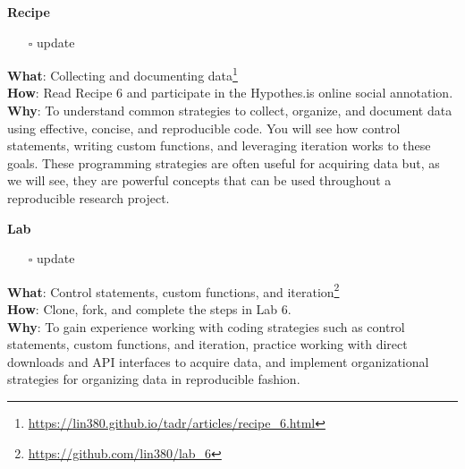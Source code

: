 \documentclass[
  letterpaper,
  DIV=11,
  numbers=noendperiod]{scrreport}
\providecommand{\tightlist}{%
  \setlength{\itemsep}{0pt}\setlength{\parskip}{0pt}}\usepackage{longtable,booktabs,array}
\theoremstyle{definition}
\theoremstyle{remark}
\DeclareRobustCommand{\href}[2]{#2\footnote{\url{#1}}}
\begin{document}
\begin{tcolorbox}[enhanced jigsaw, breakable, colback=white, rightrule=.15mm, arc=.35mm, left=2mm, toprule=.15mm, leftrule=.75mm, bottomrule=.15mm, opacityback=0]

\textbf{ Recipe}

\begin{itemize}
\tightlist
\item[$\square$]
   update
\end{itemize}

\textbf{What}:
\href{https://lin380.github.io/tadr/articles/recipe_6.html}{Collecting
and documenting data}\\
\textbf{How}: Read Recipe 6 and participate in the Hypothes.is online
social annotation.\\
\textbf{Why}: To understand common strategies to collect, organize, and
document data using effective, concise, and reproducible code. You will
see how control statements, writing custom functions, and leveraging
iteration works to these goals. These programming strategies are often
useful for acquiring data but, as we will see, they are powerful
concepts that can be used throughout a reproducible research project.

\end{tcolorbox}

\begin{tcolorbox}[enhanced jigsaw, breakable, colback=white, rightrule=.15mm, arc=.35mm, left=2mm, toprule=.15mm, leftrule=.75mm, bottomrule=.15mm, opacityback=0]

\textbf{ Lab}

\begin{itemize}
\tightlist
\item[$\square$]
   update
\end{itemize}

\textbf{What}: \href{https://github.com/lin380/lab_6}{Control
statements, custom functions, and iteration}\\
\textbf{How}: Clone, fork, and complete the steps in Lab 6.\\
\textbf{Why}: To gain experience working with coding strategies such as
control statements, custom functions, and iteration, practice working
with direct downloads and API interfaces to acquire data, and implement
organizational strategies for organizing data in reproducible fashion.

\end{tcolorbox}
\end{document}
